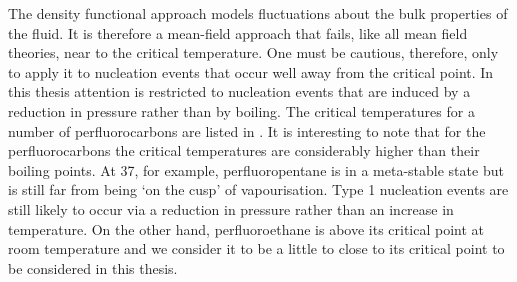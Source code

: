 The density functional approach models fluctuations about the bulk properties of the fluid.
It is therefore a mean-field approach that fails, like all mean field theories, near to the critical temperature.
One must be cautious, therefore, only to apply it to nucleation events that occur well away from the critical point.
In this thesis  attention is restricted to nucleation events that are induced by a reduction in pressure 
rather than by boiling.
The critical temperatures for a number of perfluorocarbons are listed in .
It is interesting to note that for the perfluorocarbons the critical temperatures are considerably higher than their boiling points.
At \unit{37}\degreecelsius, for example, perfluoropentane is in a meta-stable state but is still far from being `on the cusp' of vapourisation.
Type 1 nucleation events are still likely to occur via a reduction in pressure rather than an increase in temperature.
On the other hand, perfluoroethane is above its  critical point at room temperature and we 
consider it to be a little to close to its  critical point to be considered in this thesis.





%



